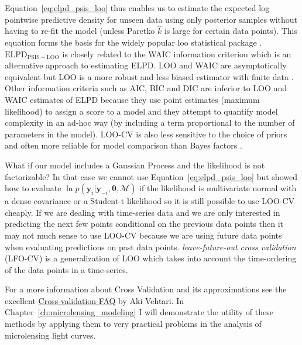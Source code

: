 \documentclass[12pt,dvipsnames]{report}
\newcommand{\ssf}[1]{\textsf{#1}}
\renewcommand{\vec}[1]{\boldsymbol{\mathbf{#1}}}
\begin{document}
Equation~\ref{eq:elpd_psis_loo} thus enables us to estimate the expected log pointwise 
predictive density for unseen data using only posterior samples without having 
to re-fit the model (unless Paretko $\hat k$ is large for certain data points). 
This equation forms the basis for the widely popular \ssf{loo} statistical package 
\citep{loo_package}.
$\mathrm{ELPD}_\mathrm{PSIS-LOO}$ is closely related to the WAIC information 
criterion \citep{arXiv:1004.2316} which is an alternative approach to estimating 
ELPD. LOO and WAIC are asymptotically equivalent but LOO is a more robust and less 
biased estimator with finite data \citep{arXiv:1507.04544}.
Other information criteria such as AIC, BIC and DIC are inferior to LOO and WAIC 
estimates of ELPD because they use point estimates (maximum likelihood) to assign 
a score to a model and they attempt to quantify model complexity in an ad-hoc 
way (by including a term proportional to the number of parameters in the model). 
LOO-CV is also less sensitive to the choice of priors and often more reliable 
for model comparison than Bayes factors \citep{10.1214/17-BA1091,arXiv:2003.04026}.

What if our model includes a Gaussian Process and the likelihood is not 
factorizable? In that case we cannot use Equation~\ref{eq:elpd_psis_loo} but 
\citet{arXiv:1810.10559} showed how to evaluate 
$\ln p(\vec y_i\lvert\vec y_{-i},\vec\theta,\mathcal{M})$ if the likelihood is 
multivariate normal with a dense covariance or a Student-t likelihood so it is 
still possible to use LOO-CV cheaply. 
If we are dealing with time-series data and we are only interested in predicting 
the next few points conditional on the previous data points then it may not 
much sense to use LOO-CV because we are using future data points when evaluating 
predictions on past data points. \textsl{leave-future-out cross validation} 
(LFO-CV) \citep{arXiv:1902.06281} is a generalization of LOO which takes into 
account the time-ordering of the data points in a time-series. 

For a more information about Cross Validation and its approximations see the excellent
\href{https://avehtari.github.io/modelselection/CV-FAQ.html}{Cross-validation FAQ}
by Aki Vehtari.
In Chapter~\ref{ch:microlensing_modeling} I will demonstrate the utility of these methods by applying 
them to very practical problems in the analysis of microlensing light curves.
\end{document}
